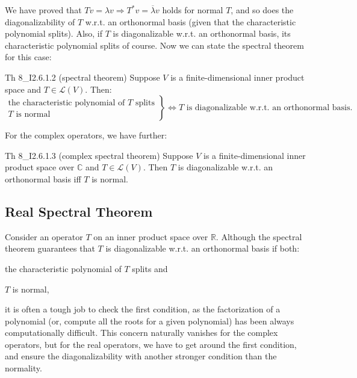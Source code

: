 \documentclass{article}
\begin{document}
We have proved that $Tv = \lambda v \Rightarrow T^*v = \overline{\lambda}v$ holds for normal $T$, and so does the diagonalizability of $T$ w.r.t. an orthonormal basis (given that the characteristic polynomial splits). Also, if $T$ is diagonalizable w.r.t. an orthonormal basis, its characteristic polynomial splits of course. Now we can state the spectral theorem for this case:

\begin{Th}{Th 8\_I2.6.1.2 (spectral theorem)}
    Suppose $V$ is a finite-dimensional inner product space and $T\in\mathcal{L}(V)$. Then:
    $$ \left. \begin{matrix}
    \text{the characteristic polynomial of } T \text{ splits} \\ 
    T \text{ is normal } \end{matrix} \right\}
    \Leftrightarrow T \text{ is diagonalizable w.r.t. an orthonormal basis}. $$
\end{Th}

For the complex operators, we have further:

\begin{Th}{Th 8\_I2.6.1.3 (complex spectral theorem)}
    Suppose $V$ is a finite-dimensional inner product space over $\mathbb{C}$ and $T\in\mathcal{L}(V)$. Then $T$ is diagonalizable w.r.t. an orthonormal basis iff $T$ is normal.
\end{Th}

\subsection{Real Spectral Theorem}
Consider an operator $T$ on an inner product space over $\mathbb{R}$. Although the spectral theorem guarantees that $T$ is diagonalizable w.r.t. an orthonormal basis if both:
\begin{compactenum}
    \item the characteristic polynomial of $T$ splits and
    \item $T$ is normal,
\end{compactenum}
it is often a tough job to check the first condition, as the factorization of a polynomial (or, compute all the roots for a given polynomial) has been always computationally difficult. This concern naturally vanishes for the complex operators, but for the real operators, we have to get around the first condition, and ensure the diagonalizability with another stronger condition than the normality.
\end{document}
